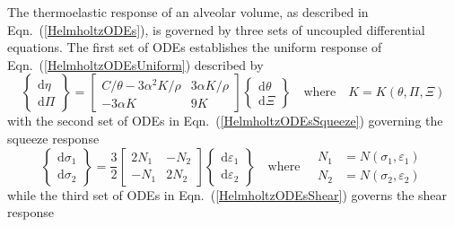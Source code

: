 The thermo\-elastic response of an alveolar volume, as described in Eqn.~(\ref{HelmholtzODEs}), is governed by three sets of uncoupled differential equations.  The first set of ODEs establishes the uniform response of Eqn.~(\ref{HelmholtzODEsUniform}) described by
\begin{displaymath}
\left\{ \begin{matrix}
\mathrm{d} \eta \\ \mathrm{d} \Pi 
\end{matrix} \right\} = \begin{bmatrix}
C / \theta - 3 \alpha^2 K / \rho & 3 \alpha K / \rho \\
-3 \alpha K & 9K
\end{bmatrix} \left\{ \begin{matrix}
\mathrm{d} \theta \\ \mathrm{d} \Xi 
\end{matrix} \right\}
\quad \text{where} \quad
K = K ( \theta , \Pi , \Xi )
\end{displaymath}
with the second set of ODEs in Eqn.~(\ref{HelmholtzODEsSqueeze}) governing the squeeze response
\begin{displaymath}
\left\{ \begin{matrix}
\mathrm{d} \sigma_1 \\ \mathrm{d} \sigma_2
\end{matrix} \right\} = \frac{3}{2} \begin{bmatrix}
2 N_1 & -N_2 \\
-N_1 & 2N_2
\end{bmatrix} \left\{ \begin{matrix}
\mathrm{d} \varepsilon_1 \\ \mathrm{d} \varepsilon_2
\end{matrix} \right\}
\quad \text{where} \quad
\begin{aligned}
N_1 & = N ( \sigma_1 , \varepsilon_1 ) \\
N_2 & = N ( \sigma_2 , \varepsilon_2 )
\end{aligned}
\end{displaymath}
while the third set of ODEs in Eqn.~(\ref{HelmholtzODEsShear}) governs the shear response
